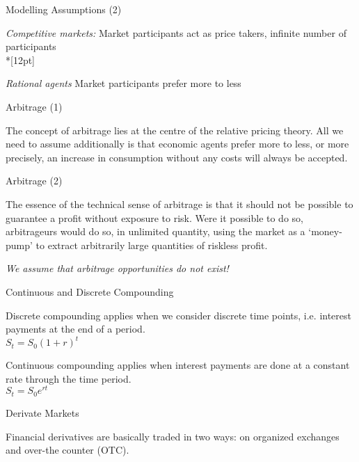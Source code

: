 
{ Modelling Assumptions (2)}


	{\it Competitive markets:}  Market participants
act as price takers, infinite number of participants\\*[12pt]

	{\it Rational agents} Market
participants prefer more to less


{ Arbitrage (1)}


	The concept of arbitrage lies at
the centre of the relative pricing theory. All we need to assume additionally is
that economic agents prefer
more to less, or more precisely, an increase in consumption
without any costs will always be accepted.


{ Arbitrage (2)}


	The essence of the technical sense of arbitrage is that it should
not be possible to guarantee a profit without exposure to risk.
Were it possible to do so, arbitrageurs would do so, in unlimited quantity,
using the market as a \lq {money-pump}' to extract arbitrarily
large quantities of riskless profit.

	{\it We assume that arbitrage opportunities do not exist!}


{Continuous and Discrete Compounding}


	Discrete compounding applies when we consider discrete time points, i.e. interest payments at the end of a period.\\

	$S_t = S_0 (1+r)^t$

	Continuous compounding applies when interest payments are done at a constant rate through the time period. \\

	$S_t = S_0e^{rt}$

{Derivate Markets}


	Financial derivatives are basically traded in two ways: on organized exchanges and over-the counter (OTC).

